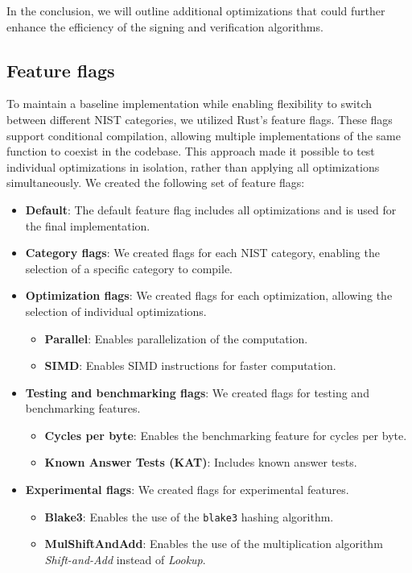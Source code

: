\documentclass[11pt]{report}
\theoremstyle{definition}
\theoremstyle{plain}
\begin{document}
In the conclusion, we will outline additional optimizations that could further enhance the efficiency of the signing and verification algorithms.

\subsection{Feature flags}\label{sub:feature_flags}
To maintain a baseline implementation while enabling flexibility to switch between different NIST categories, we utilized Rust's feature flags. These flags support conditional compilation, allowing multiple implementations of the same function to coexist in the codebase. This approach made it possible to test individual optimizations in isolation, rather than applying all optimizations simultaneously.
We created the following set of feature flags:
\begin{itemize}[parsep=0pt, itemsep=3pt]
  \item \textbf{Default}: The default feature flag includes all optimizations and is used for the final implementation.
  \item \textbf{Category flags}: We created flags for each NIST category, enabling the selection of a specific category to compile.
  \item \textbf{Optimization flags}: We created flags for each optimization, allowing the selection of individual optimizations.
        \begin{itemize}
          \item \textbf{Parallel}: Enables parallelization of the computation.
          \item \textbf{SIMD}: Enables SIMD instructions for faster computation.
        \end{itemize}
  \item \textbf{Testing and benchmarking flags}: We created flags for testing and benchmarking features.
        \begin{itemize}
          \item \textbf{Cycles per byte}: Enables the benchmarking feature for cycles per byte.
          \item \textbf{Known Answer Tests (KAT)}: Includes known answer tests.
        \end{itemize}
  \item \textbf{Experimental flags}: We created flags for experimental features.
        \begin{itemize}
          \item \textbf{Blake3}: Enables the use of the \texttt{blake3} hashing algorithm.
          \item \textbf{MulShiftAndAdd}: Enables the use of the multiplication algorithm \textit{Shift-and-Add} instead of \textit{Lookup}.
        \end{itemize}
\end{itemize}
\end{document}
